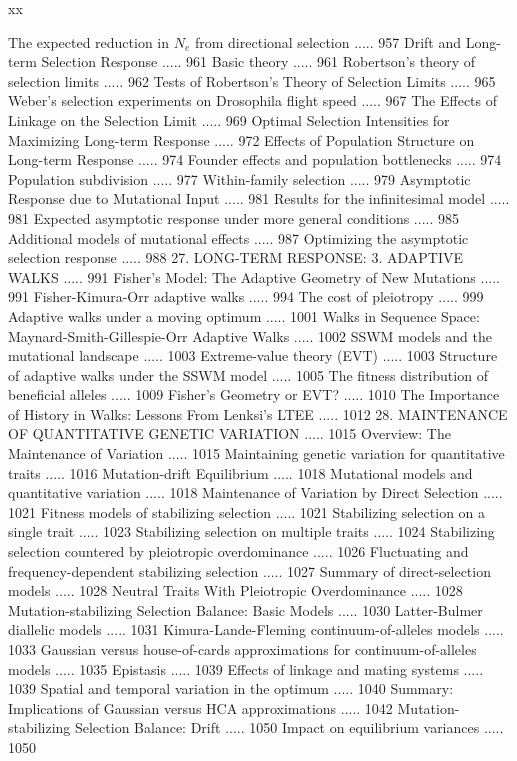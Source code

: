 \documentclass{article}
\begin{document}
xx

The expected reduction in  $ N_{e} $ from directional selection ..... 957
Drift and Long-term Selection Response ..... 961
Basic theory ..... 961
Robertson's theory of selection limits ..... 962
Tests of Robertson's Theory of Selection Limits ..... 965
Weber's selection experiments on Drosophila flight speed ..... 967
The Effects of Linkage on the Selection Limit ..... 969
Optimal Selection Intensities for Maximizing Long-term Response ..... 972
Effects of Population Structure on Long-term Response ..... 974
Founder effects and population bottlenecks ..... 974
Population subdivision ..... 977
Within-family selection ..... 979
Asymptotic Response due to Mutational Input ..... 981
Results for the infinitesimal model ..... 981
Expected asymptotic response under more general conditions ..... 985
Additional models of mutational effects ..... 987
Optimizing the asymptotic selection response ..... 988
27. LONG-TERM RESPONSE:
3. ADAPTIVE WALKS ..... 991
Fisher's Model: The Adaptive Geometry of New Mutations ..... 991
Fisher-Kimura-Orr adaptive walks ..... 994
The cost of pleiotropy ..... 999
Adaptive walks under a moving optimum ..... 1001
Walks in Sequence Space: Maynard-Smith-Gillespie-Orr Adaptive Walks ..... 1002
SSWM models and the mutational landscape ..... 1003
Extreme-value theory (EVT) ..... 1003
Structure of adaptive walks under the SSWM model ..... 1005
The fitness distribution of beneficial alleles ..... 1009
Fisher's Geometry or EVT? ..... 1010
The Importance of History in Walks: Lessons From Lenksi's LTEE ..... 1012
28. MAINTENANCE OF QUANTITATIVE GENETIC VARIATION ..... 1015
Overview: The Maintenance of Variation ..... 1015
Maintaining genetic variation for quantitative traits ..... 1016
Mutation-drift Equilibrium ..... 1018
Mutational models and quantitative variation ..... 1018
Maintenance of Variation by Direct Selection ..... 1021
Fitness models of stabilizing selection ..... 1021
Stabilizing selection on a single trait ..... 1023
Stabilizing selection on multiple traits ..... 1024
Stabilizing selection countered by pleiotropic overdominance ..... 1026
Fluctuating and frequency-dependent stabilizing selection ..... 1027
Summary of direct-selection models ..... 1028
Neutral Traits With Pleiotropic Overdominance ..... 1028
Mutation-stabilizing Selection Balance: Basic Models ..... 1030
Latter-Bulmer diallelic models ..... 1031
Kimura-Lande-Fleming continuum-of-alleles models ..... 1033
Gaussian versus house-of-cards approximations for continuum-of-alleles models ..... 1035
Epistasis ..... 1039
Effects of linkage and mating systems ..... 1039
Spatial and temporal variation in the optimum ..... 1040
Summary: Implications of Gaussian versus HCA approximations ..... 1042
Mutation-stabilizing Selection Balance: Drift ..... 1050
Impact on equilibrium variances ..... 1050
\end{document}

